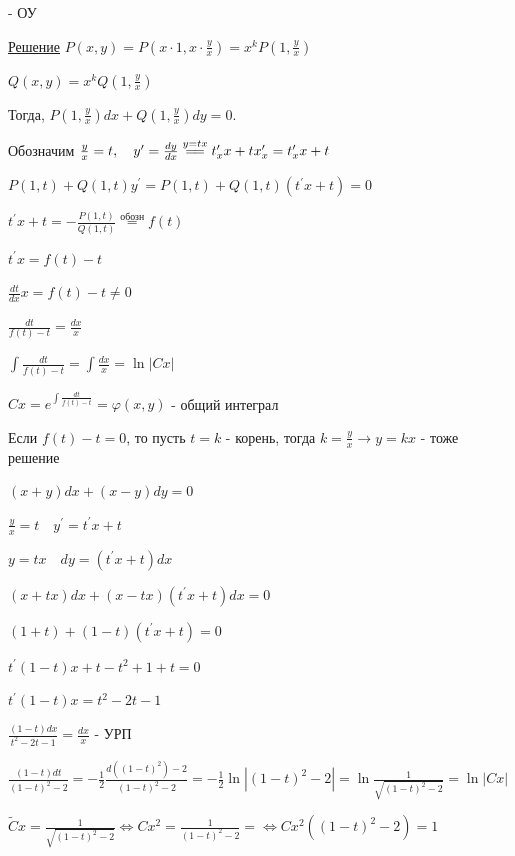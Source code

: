 \documentclass[12pt]{article}
\begin{document}
      - ОУ

    \underline{Решение} $P(x, y) = P\left(x \cdot 1, x \cdot \frac{y}{x}\right) = x^k P\left(1, \frac{y}{x}\right)$

    $Q(x, y) = x^k Q\left(1, \frac{y}{x}\right)$

    Тогда, $P\left(1, \frac{y}{x}\right)dx + Q\left(1, \frac{y}{x}\right)dy = 0$.

    Обозначим $\frac{y}{x} = t, \quad y^\prime = \frac{dy}{dx} \stackrel{y = tx}{=\joinrel=} t^\prime_x x + t x^\prime_x = t^\prime_x x + t$

    $P(1, t) + Q(1, t)y^\prime = P(1, t) + Q(1, t)(t^\prime x + t) = 0$

    $t^\prime x + t = -\frac{P(1, t)}{Q(1, t)} \stackrel{\text{обозн}}{=} f(t)$

    $t^\prime x = f(t) - t$

    $\frac{dt}{dx}x = f(t) - t \neq 0$

    $\frac{dt}{f(t) - t} = \frac{dx}{x}$

    $\int\frac{dt}{f(t) - t} = \int\frac{dx}{x} = \ln|Cx|$

    $Cx = e^{\int\frac{dt}{f(t) - t}} = \varphi(x, y)$ - общий интеграл

    Если $f(t) - t = 0$, то пусть $t = k$ - корень, тогда $k = \frac{y}{x} \to y = kx$ - тоже решение

    \Ex $(x + y)dx + (x - y)dy = 0$

    $\frac{y}{x} = t \quad y^\prime = t^\prime x + t$

    $y = tx \quad dy = (t^\prime x + t)dx$

    $(x + tx)dx + (x - tx)(t^\prime x + t)dx = 0$

    $(1 + t) + (1 - t)(t^\prime x + t) = 0$

    $t^\prime (1 - t) x + t - t^2 + 1 + t = 0$

    $t^\prime (1 - t) x = t^2 - 2t - 1$

    $\frac{(1 - t) dx}{t^2 - 2t - 1} = \frac{dx}{x}$ - УРП

    $\frac{(1 - t)dt}{(1 - t)^2 - 2} = -\frac{1}{2}\frac{d((1 - t)^2) - 2}{(1 - t)^2 - 2} = -\frac{1}{2}\ln|(1 - t)^2 - 2| = \ln\frac{1}{\sqrt{(1 - t)^2 - 2}} = \ln|Cx|$

    $\tilde{C}x = \frac{1}{\sqrt{(1 - t)^2 - 2}} \Longleftrightarrow Cx^2 = \frac{1}{(1 - t)^2 - 2} = \Longleftrightarrow Cx^2 ((1 - t)^2 - 2) = 1$
\end{document}
